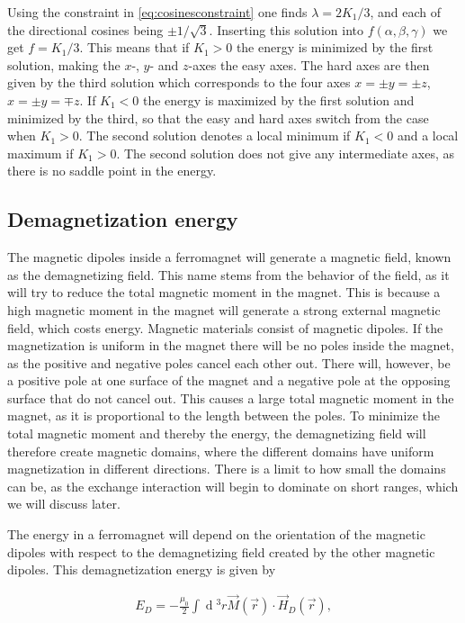 \documentclass[1p]{elsarticle}		%
\renewcommand{\d}[1]{\ensuremath{\operatorname{d}\!{#1}}}
\numberwithin{equation}{section}
\begin{document}
Using the constraint in \eqref{eq:cosinesconstraint} one finds $\lambda = 2K_1/3$, and each of the directional cosines being $\pm 1/\sqrt{3}$. Inserting this solution into $f(\alpha, \beta, \gamma)$ we get $f = K_1/3$. This means that if $K_1 > 0$ the energy is minimized by the first solution, making the $x$-, $y$- and $z$-axes the easy axes. The hard axes are then given by the third solution which corresponds to the four axes $x = \pm y = \pm z$, $x = \pm y = \mp z$. If $K_1 < 0$ the energy is maximized by the first solution and minimized by the third, so that the easy and hard axes switch from the case when $K_1 > 0$. The second solution denotes a local minimum if $K_1<0$ and a local maximum if $K_1>0$. The second solution does not give any intermediate axes, as there is no saddle point in the energy.


\subsection{Demagnetization energy}
The magnetic dipoles inside a ferromagnet will generate a magnetic field, known as the demagnetizing field. This name stems from the behavior of the field, as it will try to reduce the total magnetic moment in the magnet. This is because a high magnetic moment in the magnet will generate a strong external magnetic field, which costs energy. Magnetic materials consist of magnetic dipoles. If the magnetization is uniform in the magnet there will be no poles inside the magnet, as the positive and negative poles cancel each other out. There will, however, be a positive pole at one surface of the magnet and a negative pole at the opposing surface that do not cancel out. This causes a large total magnetic moment in the magnet, as it is proportional to the length between the poles. To minimize the total magnetic moment and thereby the energy, the demagnetizing field will therefore create magnetic domains, where the different domains have uniform magnetization in different directions. There is a limit to how small the domains can be, as the exchange interaction will begin to dominate on short ranges, which we will discuss later. 

The energy in a ferromagnet will depend on the orientation of the magnetic dipoles with respect to the demagnetizing field created by the other magnetic dipoles. This demagnetization energy is given by

\begin{align}
\label{eq:demagenergy}
E_D = -\frac{\mu_0}{2}\int \d {^3}r \vec{M}(\vec{r})\cdot\vec{H}_D(\vec{r}),
\end{align}
\end{document}
